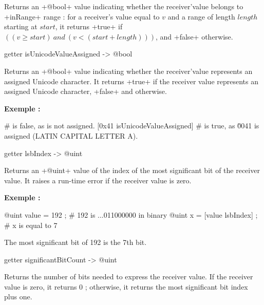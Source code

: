 {Returns an \ggst+@bool+ value indicating whether the receiver'value belongs to \ggst+inRange+ range : for a receiver's value equal to $v$ and a range of length $length$ starting at $start$, it returns \ggst+true+ if $((v \geqslant start)~and~(v<(start+length)))$, and \ggst+false+ otherwise.




\begin{galgas3}
getter isUnicodeValueAssigned -> @bool
\end{galgas3}

Returns an \ggst+@bool+ value indicating whether the receiver'value represents an assigned Unicode character. It returns \ggst+true+ if the receiver value represents an assigned Unicode character, \ggst+false+ and otherwise.

\textbf{Exemple :}
\begin{galgas3}
 # is false, as \uFFFF is not assigned.
[0x41 isUnicodeValueAssigned] # is true, as \u0041 is assigned (LATIN CAPITAL LETTER A).
\end{galgas3}




\begin{galgas3}
getter lsbIndex -> @uint
\end{galgas3}

Returns an \ggst+@uint+ value of the index of the most significant bit of the receiver value. It raises a run-time error if the receiver value is zero.

\textbf{Exemple :}
\begin{galgas3}
@uint value = 192 ; # 192 is ...011000000 in binary
@uint x = [value lsbIndex] ; # x is equal to 7
\end{galgas3}

The most significant bit of 192 is the 7th bit.





\begin{galgas3}
getter significantBitCount -> @uint
\end{galgas3}

Returns the number of bits needed to express the receiver value. If the receiver value is zero, it returns 0 ; otherwise, it returns the most significant bit index plus one.

}
